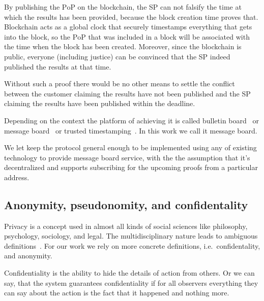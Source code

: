 \documentclass{ieeeaccess}
\begin{document}
By publishing the $\mathrm{PoP}$ on the blockchain, the SP can not falsify the time
at which the results has been provided, because the block creation time
proves that. Blockchain acts as a global clock that securely timestamps
everything that gets into the block, so the $\mathrm{PoP}$ that was included in a
block will be associated with the time when the block has been created. Moreover, since the blockchain is public, everyone (including justice) can be convinced that the SP indeed published the results at that time.

Without such a proof there would be no other means to settle the conflict between the customer claiming the results have not been published and the SP claiming the results have been published within the deadline.

Depending on the context the platform of achieving it is called bulletin board~\cite{achenbach2015improved} or message board~\cite{hinarejos2019solution} or trusted timestamping~\cite{gipp2015decentralized}. In this work we call it message board.



We let keep the protocol general enough to 
be implemented using any of  
existing technology to provide message board service, with the
the assumption that it's decentralized and supports subscribing for the
upcoming proofs from a particular address.



\subsection{Anonymity, pseudonomity, and confidentality}\label{sec:pseudo-anon}


Privacy is a concept used in almost all kinds of social sciences like philosophy, psychology, sociology, and legal. The multidisciplinary nature leads to ambiguous definitions~\cite{smith2011information}. For our work we rely on more concrete definitions, i.e.~confidentality, and anonymity.

Confidentiality is the ability to hide the details of action from others. Or we can say, that the system guarantees confidentiality if for all observers everything they can say about the action is the fact that it happened and nothing more.
\end{document}
